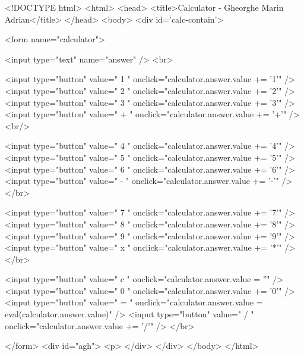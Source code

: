 <!DOCTYPE html>
<html>
    <head>
        <title>Calculator - Gheorghe Marin Adrian</title>
    </head>
    <body>
        <div id='calc-contain'>
  
          <form name="calculator">
            
            <input type="text" name="answer" />
            <br>
            
            <input type="button" value=" 1 " onclick="calculator.answer.value += '1'" />
            <input type="button" value=" 2 " onclick="calculator.answer.value += '2'" />
            <input type="button" value=" 3 " onclick="calculator.answer.value += '3'" />
            <input type="button" value=" + " onclick="calculator.answer.value += '+'" />
            <br/>
            
            <input type="button" value=" 4 " onclick="calculator.answer.value += '4'" />
            <input type="button" value=" 5 " onclick="calculator.answer.value += '5'" />
            <input type="button" value=" 6 " onclick="calculator.answer.value += '6'" />
            <input type="button" value=" - " onclick="calculator.answer.value += '-'" />
            </br>
          
            <input type="button" value=" 7 " onclick="calculator.answer.value += '7'" />
            <input type="button" value=" 8 " onclick="calculator.answer.value += '8'" />
            <input type="button" value=" 9 " onclick="calculator.answer.value += '9'" />
            <input type="button" value=" x " onclick="calculator.answer.value += '*'" />
            </br>
        
            <input type="button" value=" c " onclick="calculator.answer.value = ''" />
            <input type="button" value=" 0 " onclick="calculator.answer.value += '0'" />
            <input type="button" value=" = " onclick="calculator.answer.value = eval(calculator.answer.value)" />
            <input type="button" value=" / " onclick="calculator.answer.value += '/'" />
            </br>
  
    
          </form>
          <div id="agh">
            <p>
          </div>
        </div>
    </body>
</html>